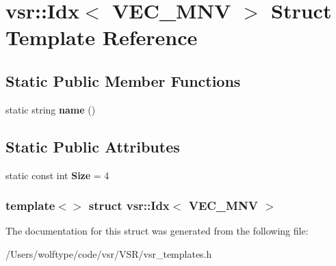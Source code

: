 \hypertarget{structvsr_1_1_idx_3_01_v_e_c___m_n_v_01_4}{\section{vsr\-:\-:Idx$<$ V\-E\-C\-\_\-\-M\-N\-V $>$ Struct Template Reference}
\label{structvsr_1_1_idx_3_01_v_e_c___m_n_v_01_4}
}
\subsection*{Static Public Member Functions}
\begin{DoxyCompactItemize}
\item 
\hypertarget{structvsr_1_1_idx_3_01_v_e_c___m_n_v_01_4_aad39716d1f76112bc5c877fdbf004179}{static string {\bfseries name} ()}\label{structvsr_1_1_idx_3_01_v_e_c___m_n_v_01_4_aad39716d1f76112bc5c877fdbf004179}

\end{DoxyCompactItemize}
\subsection*{Static Public Attributes}
\begin{DoxyCompactItemize}
\item 
\hypertarget{structvsr_1_1_idx_3_01_v_e_c___m_n_v_01_4_a2017f93ffe581cb59e1dafa3ca2ea406}{static const int {\bfseries Size} = 4}\label{structvsr_1_1_idx_3_01_v_e_c___m_n_v_01_4_a2017f93ffe581cb59e1dafa3ca2ea406}

\end{DoxyCompactItemize}
\subsubsection*{template$<$$>$ struct vsr\-::\-Idx$<$ V\-E\-C\-\_\-\-M\-N\-V $>$}



The documentation for this struct was generated from the following file\-:\begin{DoxyCompactItemize}
\item 
/\-Users/wolftype/code/vsr/\-V\-S\-R/vsr\-\_\-templates.\-h\end{DoxyCompactItemize}
